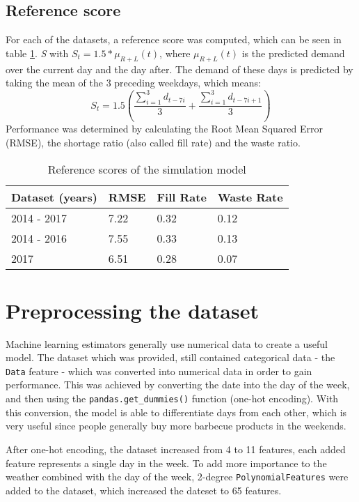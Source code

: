 \documentclass[final,authoryear,5p,times,twocolumn, 11pt]{elsarticle}
\begin{document}
\subsection{Reference score}
For each of the datasets, a reference score was computed, which can be seen in table \ref{tab:reference_scores}. \textit{S} with $S_{t} = 1.5*\mu_{R+L}(t)$, where $\mu_{R+L}(t)$ is the predicted demand over the current day and the day after. The demand of these days is predicted by taking the mean of the 3 preceding weekdays, which means:
\begin{equation}
S_{t} = 1.5(\frac{\sum_{i=1}^{3} d_{t-7i}}{3} + \dfrac{\sum_{i=1}^{3} d_{t-7i+1}}{3})
\end{equation}
Performance was determined by calculating the Root Mean Squared Error (RMSE), the shortage ratio (also called fill rate) and the waste ratio.
\begin{table}[h!]
	\begin{tabular}{llll}
		\hline
		Dataset (years) & RMSE & Fill Rate & Waste Rate \\ \hline
		2014 - 2017 	& 7.22 & 0.32      & 0.12       \\
		2014 - 2016 	& 7.55 & 0.33      & 0.13       \\
		2017        	& 6.51 & 0.28      & 0.07       \\ \hline
	\end{tabular}
\caption{Reference scores of the simulation model}
\label{tab:reference_scores}
\end{table}

\section{Preprocessing the dataset}
\label{sec:preprocessing}
Machine learning estimators generally use numerical data to create a useful model. The dataset which was provided, still contained categorical data - the \texttt{Data} feature - which was converted into numerical data in order to gain performance. This was achieved by converting the date into the day of the week, and then using the \texttt{pandas.get\_dummies()} function (one-hot encoding). With this conversion, the model is able to differentiate days from each other, which is very useful since people generally buy more barbecue products in the weekends.

After one-hot encoding, the dataset increased from 4 to 11 features, each added feature represents a single day in the week. To add more importance to the weather combined with the day of the week, 2-degree \texttt{PolynomialFeatures} were added to the dataset, which increased the dateset to 65 features.
\end{document}
